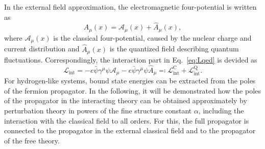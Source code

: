 In the external field approximation, the electromagnetic four-potential is written as
\begin{equation}
A_\mu(x) = \mathcal{A}_\mu(x) + \hat{A}_\mu(x),
\end{equation}
where $\mathcal{A}_\mu(x)$ is the classical four-potential, caused by the nuclear charge and current distribution and $\hat{A}_\mu(x)$ is the quantized field describing quantum fluctuations. Correspondingly, the interaction part in Eq.~\eqref{eq:Lqed} is devided as
\begin{equation}
\label{eq:Lint}
\mathcal{L}_{\text{int}}=-e\bar{\psi}\gamma^\mu \psi \mathcal{A}_\mu-e\bar{\psi}\gamma^\mu \psi \hat{A}_\mu\eqqcolon\mathcal{L}_{\text{int}}^{\text{C}} + \mathcal{L}_{\text{int}}^{\text{Q}}.
\end{equation}
For hydrogen-like systems, bound state energies can be extracted from the poles of the fermion propagator. In the following, it will be demonstrated how the poles of the propagator in the interacting theory can be obtained approximately by perturbation theory in powers of the fine structure constant $\alpha$, including the interaction with the classical field to all orders. For this, the full propagator is connected to the propagator in the external classical field and to the propagator of the free theory.
